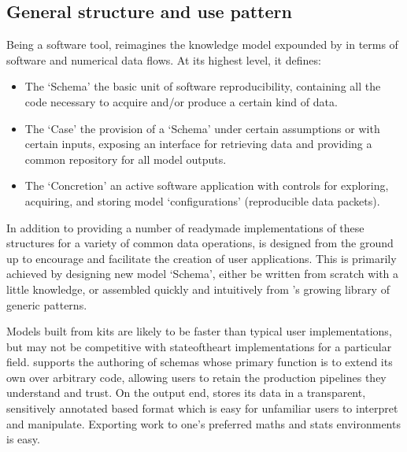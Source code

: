 \documentclass[letterpaper,10pt,english]{jupyterBook}
\begin{document}
\subsection{General structure and use pattern}
\label{\detokenize{content/chapter_03_everest/framework:general-structure-and-use-pattern}}
\sphinxAtStartPar
Being a software tool,  reimagines the knowledge model expounded by  in terms of software and numerical data flows. At its highest level, it defines:
\begin{itemize}
\item {} 
\sphinxAtStartPar
The  ‘Schema’ \sphinxhyphen{} the basic unit of software reproducibility, containing all the code necessary to acquire and/or produce a certain kind of data.

\item {} 
\sphinxAtStartPar
The  ‘Case’ \sphinxhyphen{} the provision of a ‘Schema’ under certain assumptions or with certain inputs, exposing an interface for retrieving data and providing a common repository for all model outputs.

\item {} 
\sphinxAtStartPar
The  ‘Concretion’ \sphinxhyphen{} an active software application with controls for exploring, acquiring, and storing model ‘configurations’ (reproducible data packets).

\end{itemize}

\sphinxAtStartPar
In addition to providing a number of ready\sphinxhyphen{}made implementations of these structures for a variety of common data operations,  is designed from the ground up to encourage and facilitate the creation of user applications. This is primarily achieved by designing new model ‘Schema’, either be written from scratch with a little  knowledge, or assembled quickly and intuitively from ’s growing library of generic patterns.

\sphinxAtStartPar
Models built from  kits are likely to be faster than typical user implementations, but may not be competitive with state\sphinxhyphen{}of\sphinxhyphen{}the\sphinxhyphen{}art implementations for a particular field.  supports the authoring of schemas whose primary function is to extend its own  over arbitrary code, allowing users to retain the production pipelines they understand and trust. On the output end,  stores its data in a transparent, sensitively annotated \sphinxhyphen{}based format which is easy for unfamiliar users to interpret and manipulate. Exporting work to one’s preferred maths and stats environments is easy.
\end{document}
